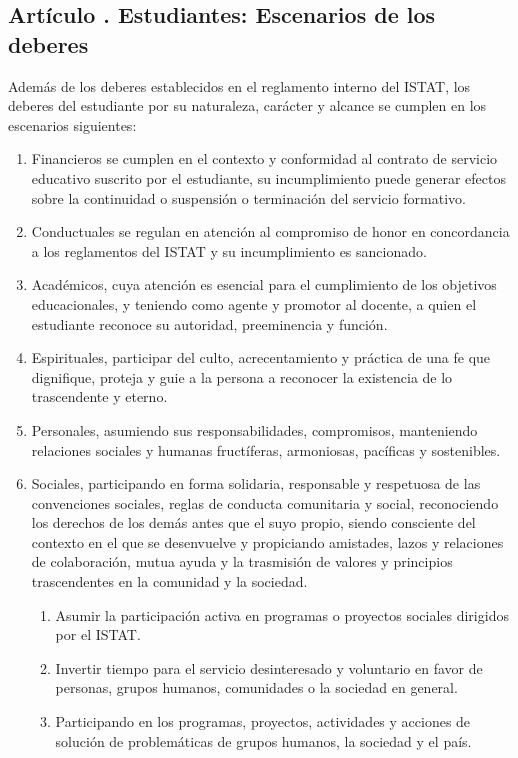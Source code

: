 \subsection{Artículo . Estudiantes: Escenarios de los deberes}
\addtocounter{ns}{1}
Además de los deberes establecidos en el reglamento interno del ISTAT, los deberes del estudiante por su naturaleza, carácter y alcance se cumplen en los escenarios siguientes: 
\begin{enumerate}
\item Financieros se cumplen en el contexto y conformidad al contrato de servicio educativo suscrito por el estudiante, su incumplimiento puede generar efectos sobre la continuidad o suspensión o terminación del servicio formativo. 
\item Conductuales se regulan en atención al compromiso de honor en concordancia a los reglamentos del ISTAT y su incumplimiento es sancionado. 
\item Académicos, cuya atención es esencial para el cumplimiento de los objetivos educacionales, y teniendo como agente y promotor al docente, a quien el estudiante reconoce su autoridad, preeminencia y función. 
\item Espirituales, participar del culto, acrecentamiento y práctica de una fe que dignifique, proteja y guie a la persona a reconocer la existencia de lo trascendente y eterno. 
\item Personales, asumiendo sus responsabilidades, compromisos, manteniendo relaciones sociales y humanas fructíferas, armoniosas, pacíficas y sostenibles. 
\item Sociales, participando en forma solidaria, responsable y respetuosa de las convenciones sociales, reglas de conducta comunitaria y social, reconociendo los derechos de los demás antes que el suyo propio, siendo consciente del contexto en el que se desenvuelve y propiciando amistades, lazos y relaciones de colaboración, mutua ayuda y la trasmisión de valores y principios trascendentes en la comunidad y la sociedad. 
	\begin{enumerate}
		\item Asumir la participación activa en programas o proyectos sociales dirigidos por el ISTAT. 
		\item Invertir tiempo para el servicio desinteresado y voluntario en favor de personas, grupos humanos, comunidades o la sociedad en general. 
		\item Participando en los programas, proyectos, actividades y acciones de solución de problemáticas de grupos humanos, la sociedad y el país. 
	\end{enumerate}
\end{enumerate}
